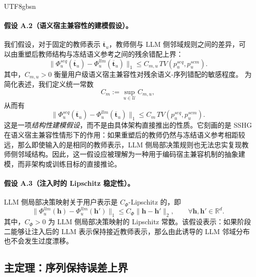 \documentclass{article}
\begin{document}
\begin{CJK*}{UTF8}{gbsn}
\paragraph{假设 A.2（语义宿主兼容性的建模假设）。}
我们假设，对于固定的教师表示 $\overline{\mathbf{t}}_u$，教师侧与 LLM 侧邻域规则之间的差异，可以由重塑后教师结构与冻结语义参考之间的残余错配上界：
\begin{equation}
\|\Phi_u^{seq}(\overline{\mathbf{t}}_u)-\Phi_u^{llm}(\overline{\mathbf{t}}_u)\|_1
\le
C_{m,u}\,TV(p_u^{seq},p_u^{sem}).
\label{eq:compat_user}
\end{equation}
其中，$C_{m,u}>0$ 衡量用户级语义宿主兼容性对残余语义-序列错配的敏感程度。
为简化表述，我们定义统一常数
\begin{equation}
C_m:=\sup_{u\in\mathcal U} C_{m,u},
\label{eq:compat_uniform_const}
\end{equation}
从而有
\begin{equation}
\|\Phi_u^{seq}(\overline{\mathbf{t}}_u)-\Phi_u^{llm}(\overline{\mathbf{t}}_u)\|_1
\le
C_m\,TV(p_u^{seq},p_u^{sem}).
\label{eq:compat_uniform}
\end{equation}
这是一项\emph{结构性建模假设}，而不是由具体架构直接推出的性质。它刻画的是 SSHG 在语义宿主兼容性情形下的作用：如果重塑后的教师仍然与冻结语义参考相距较远，那么即使输入的是相同的教师表示，LLM 侧局部决策规则也无法忠实复现教师侧邻域结构。因此，这一假设应被理解为一种用于编码宿主兼容机制的抽象建模，而非架构或训练目标的直接推论。

\paragraph{假设 A.3（注入时的 Lipschitz 稳定性）。}
LLM 侧局部决策映射关于用户表示是 $C_\Phi$-Lipschitz 的，即
\begin{equation}
\|\Phi_u^{llm}(\mathbf{h})-\Phi_u^{llm}(\mathbf{h}')\|_1
\le
C_\Phi\|\mathbf{h}-\mathbf{h}'\|_2,
\qquad
\forall \mathbf{h},\mathbf{h}'\in\mathbb R^d.
\label{eq:lipschitz_llm}
\end{equation}
其中，$C_\Phi>0$ 为 LLM 侧局部决策映射的 Lipschitz 常数。该假设表示：如果阶段二能够让注入后的 LLM 表示保持接近教师表示，那么由此诱导的 LLM 邻域分布也不会发生过度漂移。

\subsection{主定理：序列保持误差上界}
\label{app:main_theorem}


\end{CJK*}
\end{document}
